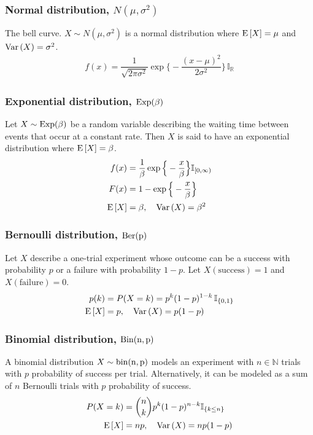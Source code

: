 \documentclass[12pt, notitlepage]{article}
\begin{document}
\subsubsection*{Normal distribution, $\mathit{N}(\mu, \sigma^2)$}
The bell curve. $X \sim N(\mu, \sigma^2)$ is a normal distribution where $\mathrm{E}\,[X] = \mu$ and $\mathrm{Var}\,(X) = \sigma^2$. 
\begin{align*}
f(x) = \dfrac{1}{\sqrt{2\pi \sigma^2}} \exp \Big\{ - \dfrac{(x-\mu)^2}{2\sigma^2} \Big\} \, \mathbb{I}_\mathbb{R}
\end{align*}

\subsubsection*{Exponential distribution, $\rm{Exp}(\beta)$}
Let $X \sim \rm{Exp}(\beta)$ be a random variable describing the waiting time between events that occur at a constant rate. Then $X$ is said to have an exponential distribution where $\mathrm{E}\,[X] = \beta$. 
\begin{align*}
f(x) &= \dfrac{1}{\beta} \exp \Big\{ - \dfrac{x}{\beta} \Big\}\mathbb{I}_{[0, \infty)} \\
F(x) & = 1 - \exp \Big\{ - \dfrac{x}{\beta} \Big\} \\
\mathrm{E}\,[X] &= \beta, \quad \mathrm{Var}\,(X) = \beta^2
\end{align*}

\subsubsection*{Bernoulli distribution, $\rm{Ber}(p)$}
Let $X$ describe a one-trial experiment whose outcome can be a success with probability $p$ or a failure with probability $1-p$. Let $X(\text{success}) = 1$ and $X(\text{failure}) = 0$. 
\begin{align*}
p(k) & = P(X=k) = p^k (1-p)^{1-k} \, \mathbb{I}_{\{0,1\}} \\
\mathrm{E}\,[X] & = p, \quad \mathrm{Var}\,(X) = p(1-p)
\end{align*}

\subsubsection*{Binomial distribution, $\rm{Bin}(n,p)$}
A binomial distribution $X \sim \rm{bin}(n, p)$ models an experiment with $n \in \mathbb{N}$ trials with $p$ probability of success per trial. Alternatively, it can be modeled as a sum of $n$ Bernoulli trials with $p$ probability of success. 
\begin{align*}
P(X=k) & = \binom{n}{k}p^k (1-p)^{n-k}\mathbb{I}_{\{k \leq n\}} \\
\mathrm{E}\,[X] & = np, \quad \mathrm{Var}\,(X)  = np(1-p)
\end{align*}
\end{document}
